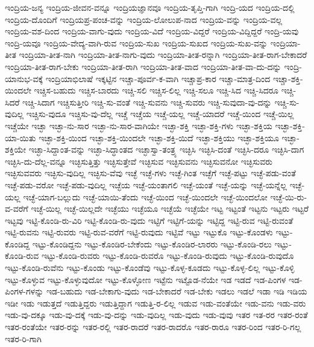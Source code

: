 {ಇಂದ್ರಿಯ-ಜನ್ಯ
ಇಂದ್ರಿಯ-ಜೀವನ-ವನ್ನೂ
ಇಂದ್ರಿಯಜ್ಞಾನವೂ
ಇಂದ್ರಿಯ-ತೃಪ್ತಿ-ಗಾಗಿ
ಇಂದ್ರಿ-ಯದ
ಇಂದ್ರಿಯ-ದಲ್ಲಿ
ಇಂದ್ರಿಯ-ದೊಂದಿಗೆ
ಇಂದ್ರಿಯಪ್ರ-ಪಂಚ-ವನ್ನು
ಇಂದ್ರಿಯ-ಲೋಲುಪ-ನಾದ
ಇಂದ್ರಿಯ-ವನ್ನು
ಇಂದ್ರಿಯ-ವಲ್ಲ
ಇಂದ್ರಿಯ-ವಶ-ದಿಂದ
ಇಂದ್ರಿಯ-ವಾಗು-ವುದು
ಇಂದ್ರಿಯ-ವಿದೆ
ಇಂದ್ರಿಯ-ವಿದ್ದರೆ
ಇಂದ್ರಿಯ-ವಿದ್ದಿದ್ದರೆ
ಇಂದ್ರಿ-ಯವು
ಇಂದ್ರಿ-ಯವೂ
ಇಂದ್ರಿಯ-ವೇದ್ಯ-ವಾಗಿ-ರುವ
ಇಂದ್ರಿಯ-ಸುಖ
ಇಂದ್ರಿಯ-ಸುಖದ
ಇಂದ್ರಿಯ-ಸುಖ-ವನ್ನು
ಇಂದ್ರಿಯಾ-ತೀತ
ಇಂದ್ರಿಯಾ-ತೀತ-ನಾಗಿ
ಇಂದ್ರಿಯಾ-ತೀತ-ನಾಗು-ವುದು
ಇಂದ್ರಿಯಾ-ತೀತ-ರನ್ನಾಗಿ
ಇಂದ್ರಿಯಾ-ತೀತ-ರಾಗ-ಬೇಕಾದರೆ
ಇಂದ್ರಿಯಾ-ತೀತ-ರಾಗ-ಬೇಕು
ಇಂದ್ರಿಯಾ-ತೀತ-ರಾಗಿ
ಇಂದ್ರಿಯಾ-ತೀತ-ವಾದ
ಇಂದ್ರಿಯಾ-ತೀತ-ವಾ-ದು-ದನ್ನು
ಇಂದ್ರಿ-ಯಾನುಭ-ವಕ್ಕೆ
ಇಂದ್ರಿಯಾಭಿಲಾಷೆ
ಇಕ್ಕಟ್ಟಿನ
ಇಚ್ಚಾ-ಪೂರ್ವ-ಕ-ವಾಗಿ
ಇಚ್ಚಾಪ್ರ-ಕಾರ
ಇಚ್ಚಾ-ಮಾತ್ರ-ದಿಂದ
ಇಚ್ಚಾ-ಶಕ್ತಿ-ಯಿಂದಲೇ
ಇಚ್ಚಿಸ-ಬಹುದು
ಇಚ್ಚಿಸ-ಬಾರದು
ಇಚ್ಚಿ-ಸಲಿ
ಇಚ್ಚಿಸ-ಲಿಲ್ಲ
ಇಚ್ಚಿ-ಸಲೂ
ಇಚ್ಚಿ-ಸಿದ
ಇಚ್ಚಿ-ಸಿದರೂ
ಇಚ್ಚಿ-ಸಿದರೆ
ಇಚ್ಚಿ-ಸಿದಾಗ
ಇಚ್ಚಿಸುತ್ತೀರಿ
ಇಚ್ಚಿ-ಸು-ವಂತೆ
ಇಚ್ಚಿ-ಸುವನು
ಇಚ್ಚಿ-ಸುವರು
ಇಚ್ಚಿ-ಸುವುದಾ-ವು-ದನ್ನು
ಇಚ್ಚಿ-ಸು-ವುದಿಲ್ಲ
ಇಚ್ಚಿಸು-ವುದೂ
ಇಚ್ಚಿಸು-ವು-ದೆಲ್ಲ
ಇಚ್ಚೆ
ಇಚ್ಚೆಯ
ಇಚ್ಚೆ-ಯಲ್ಲ
ಇಚ್ಚೆ-ಯಾದರೆ
ಇಚ್ಚೆ-ಯಿಂದ
ಇಚ್ಚೆ-ಯಿಲ್ಲ
ಇಚ್ಚೆಯೇ
ಇಚ್ಛಾ
ಇಚ್ಛಾ-ನು-ಸಾರ
ಇಚ್ಛಾ-ನು-ಸಾರ-ವಾಗಿಯೇ
ಇಚ್ಛಾ-ಶಕ್ತಿ
ಇಚ್ಛಾ-ಶಕ್ತಿ-ಗಳು
ಇಚ್ಛಾ-ಶಕ್ತಿಯ
ಇಚ್ಛಾ-ಶಕ್ತಿ-ಯಾ-ಯಿತು
ಇಚ್ಛಾ-ಶಕ್ತಿ-ಯಿಂದ
ಇಚ್ಛಾ-ಶಕ್ತಿ-ಯಿಂದಲೇ
ಇಚ್ಛಾ-ಶಕ್ತಿ-ಯಿದೆ
ಇಚ್ಛಾ-ಶಕ್ತಿಯು
ಇಚ್ಛಾ-ಶಕ್ತಿಯೂ
ಇಚ್ಛಾ-ಶಕ್ತಿಯೇ
ಇಚ್ಛಾ-ಸಿದ್ದಾಂತ-ವನ್ನು
ಇಚ್ಛಾ-ಸಿದ್ಧಾಂತದ
ಇಚ್ಛಾಸ್ವಾ-ತಂತ್ರ್ಯ
ಇಚ್ಛಿಸಿ
ಇಚ್ಛಿಸಿ-ದಂತೆ
ಇಚ್ಛಿಸಿ-ದರೂ
ಇಚ್ಛಿಸಿ-ದಾಗ
ಇಚ್ಛಿಸಿ-ದು-ದೆಲ್ಲ-ವನ್ನೂ
ಇಚ್ಛಿಸುತ್ತಿತ್ತು
ಇಚ್ಛಿಸುತ್ತೇವೆ
ಇಚ್ಛಿಸುವ
ಇಚ್ಛಿಸುವನು
ಇಚ್ಛಿಸುವನೋ
ಇಚ್ಛಿಸುವರು
ಇಚ್ಛಿಸುವವರು
ಇಚ್ಛಿಸು-ವುದಿಲ್ಲ
ಇಚ್ಛಿಸು-ವೆವು
ಇಚ್ಛೆ
ಇಚ್ಛೆ-ಗಳು
ಇಚ್ಛೆ-ಗಿಂತ
ಇಚ್ಛೆಗೆ
ಇಚ್ಛೆ-ಪಟ್ಟು
ಇಚ್ಛೆ-ಪಡು-ವಂತೆ
ಇಚ್ಛೆ-ಪಡು-ವರೋ
ಇಚ್ಛೆ-ಪಡು-ವುದಿಲ್ಲ
ಇಚ್ಛೆಯ
ಇಚ್ಛೆ-ಯಂತಾಗಲಿ
ಇಚ್ಛೆ-ಯಂತೆ
ಇಚ್ಛೆ-ಯನ್ನು
ಇಚ್ಛೆ-ಯನ್ನೆಲ್ಲ
ಇಚ್ಛೆ-ಯಲ್ಲ
ಇಚ್ಛೆ-ಯಾಗ-ಬಲ್ಲುದು
ಇಚ್ಛೆ-ಯಾಯಿ-ತೆಂದು
ಇಚ್ಛೆ-ಯಿಂದ
ಇಚ್ಛೆ-ಯಿಂದಲೇ
ಇಚ್ಛೆ-ಯಿಂದಲೋ
ಇಚ್ಛೆ-ಯಿ-ರು-ವ-ವರೆಗೆ
ಇಚ್ಛೆ-ಯಿಲ್ಲ
ಇಚ್ಛೆ-ಯಿಲ್ಲದೇ
ಇಚ್ಛೆಯು
ಇಚ್ಛೆಯೂ
ಇಚ್ಛೆಯೆ
ಇಚ್ಛೆಯೇ
ಇಟ್ಟ
ಇಟ್ಟಂತೆ
ಇಟ್ಟನು
ಇಟ್ಟರು
ಇಟ್ಟರೆ
ಇಟ್ಟವು
ಇಟ್ಟಿ-ಕೊಂಡಿ-ರು-ವಿರಿ
ಇಟ್ಟಿ-ಕೊಂಡಿ-ರು-ವುದು
ಇಟ್ಟಿಗೆ
ಇಟ್ಟಿಗೆ-ಯನ್ನು
ಇಟ್ಟಿದ್ದ
ಇಟ್ಟಿ-ರುವ
ಇಟ್ಟಿ-ರುವಂತೆ
ಇಟ್ಟಿ-ರುವನು
ಇಟ್ಟಿ-ರುವರು
ಇಟ್ಟಿ-ರುವ-ವರೆಗೆ
ಇಟ್ಟಿ-ರುವುದು
ಇಟ್ಟಿವೆ
ಇಟ್ಟು
ಇಟ್ಟುಕೊ
ಇಟ್ಟು-ಕೊಂಡಳು
ಇಟ್ಟು-ಕೊಂಡಿದ್ದ
ಇಟ್ಟು-ಕೊಂಡಿದ್ದನು
ಇಟ್ಟು-ಕೊಂಡಿರ-ಬೇಕೆಂದು
ಇಟ್ಟು-ಕೊಂಡಿರ-ಲಾರರು
ಇಟ್ಟು-ಕೊಂಡಿ-ರಲು
ಇಟ್ಟು-ಕೊಂಡಿ-ರುವ
ಇಟ್ಟು-ಕೊಂಡಿ-ರುವರು
ಇಟ್ಟು-ಕೊಂಡಿ-ರುವರೊ
ಇಟ್ಟು-ಕೊಂಡಿ-ರುವುದು
ಇಟ್ಟು-ಕೊಂಡಿ-ರುವುದೊ
ಇಟ್ಟು-ಕೊಂಡಿ-ರುವೆನು
ಇಟ್ಟು-ಕೊಂಡು
ಇಟ್ಟು-ಕೊಂಡೆವು
ಇಟ್ಟು-ಕೊಳ್ಳ-ಕೂಡದು
ಇಟ್ಟು-ಕೊಳ್ಳ-ಲಿಲ್ಲ
ಇಟ್ಟು-ಕೊಳ್ಳಿ
ಇಟ್ಟು-ಕೊಳ್ಳುವ
ಇಟ್ಟು-ಕೊಳ್ಳುವುದೋ
ಇಟ್ಟು-ಕೊಳ್ಳೋಣ
ಇಟ್ಟೆನು
ಇಟ್ಟೊಡ-ನೆಯೇ
ಇಡ
ಇಡದೆ
ಇಡ-ಪಿಂಗಳ
ಇಡ-ಪಿಂಗಳ-ಗಳನ್ನು
ಇಡ-ಬಹುದು
ಇಡ-ಬೇಕಾಗು-ವುದು
ಇಡ-ಬೇಕಾದರೆ
ಇಡ-ಬೇಕು
ಇಡಲು
ಇಡಲೆ
ಇಡಾ
ಇಡಿ
ಇಡಿಯ
ಇಡೀ
ಇಡು
ಇಡುತ್ತದೆ
ಇಡುತ್ತಿದ್ದರು
ಇಡುತ್ತಿದ್ದಾಗ
ಇಡುತ್ತಿ-ರ-ಲಿಲ್ಲ
ಇಡುವ
ಇಡು-ವಂತೆಯೇ
ಇಡು-ವನು
ಇಡು-ವರು
ಇಡು-ವು-ದಕ್ಕೂ
ಇಡು-ವು-ದಕ್ಕೆ
ಇಡು-ವು-ದನ್ನು
ಇಡು-ವುದಿಲ್ಲ
ಇಡು-ವುದು
ಇಡು-ವುವು
ಇತರ
ಇತ-ರರ
ಇತರ-ರಂತೆ
ಇತರ-ರಂತೆಯೇ
ಇತರ-ರನ್ನು
ಇತರ-ರಲ್ಲಿ
ಇತರ-ರಾದರೆ
ಇತರ-ರಾದರೊ
ಇತರ-ರಾರೂ
ಇತರ-ರಿಂದ
ಇತರ-ರಿ-ಗಲ್ಲ
ಇತರ-ರಿ-ಗಾಗಿ
}
